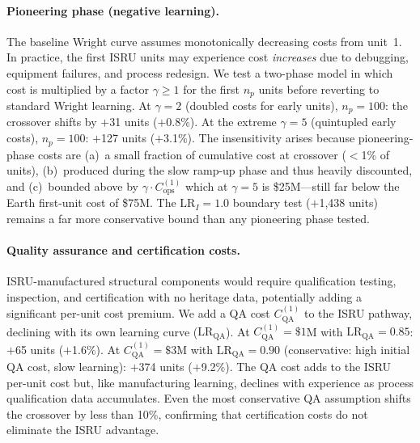 \documentclass[preprint,12pt]{elsarticle}
\begin{document}
\paragraph{Pioneering phase (negative learning).} The baseline Wright curve assumes monotonically decreasing costs from unit~1. In practice, the first ISRU units may experience cost \emph{increases} due to debugging, equipment failures, and process redesign. We test a two-phase model in which cost is multiplied by a factor $\gamma \geq 1$ for the first $n_p$ units before reverting to standard Wright learning. At $\gamma = 2$ (doubled costs for early units), $n_p = 100$: the crossover shifts by $+$31 units ($+$0.8\%). At the extreme $\gamma = 5$ (quintupled early costs), $n_p = 100$: $+$127 units ($+$3.1\%). The insensitivity arises because pioneering-phase costs are (a)~a small fraction of cumulative cost at crossover ($<$1\% of units), (b)~produced during the slow ramp-up phase and thus heavily discounted, and (c)~bounded above by $\gamma \cdot C_{\mathrm{ops}}^{(1)}$ which at $\gamma = 5$ is \$25M---still far below the Earth first-unit cost of \$75M. The $\mathrm{LR}_I = 1.0$ boundary test ($+$1{,}438 units) remains a far more conservative bound than any pioneering phase tested.

\paragraph{Quality assurance and certification costs.} ISRU-manufactured structural components would require qualification testing, inspection, and certification with no heritage data, potentially adding a significant per-unit cost premium. We add a QA cost $C_{\mathrm{QA}}^{(1)}$ to the ISRU pathway, declining with its own learning curve ($\mathrm{LR}_{\mathrm{QA}}$). At $C_{\mathrm{QA}}^{(1)} = \$1$M with $\mathrm{LR}_{\mathrm{QA}} = 0.85$: $+$65 units ($+$1.6\%). At $C_{\mathrm{QA}}^{(1)} = \$3$M with $\mathrm{LR}_{\mathrm{QA}} = 0.90$ (conservative: high initial QA cost, slow learning): $+$374 units ($+$9.2\%). The QA cost adds to the ISRU per-unit cost but, like manufacturing learning, declines with experience as process qualification data accumulates. Even the most conservative QA assumption shifts the crossover by less than 10\%, confirming that certification costs do not eliminate the ISRU advantage.
\end{document}
